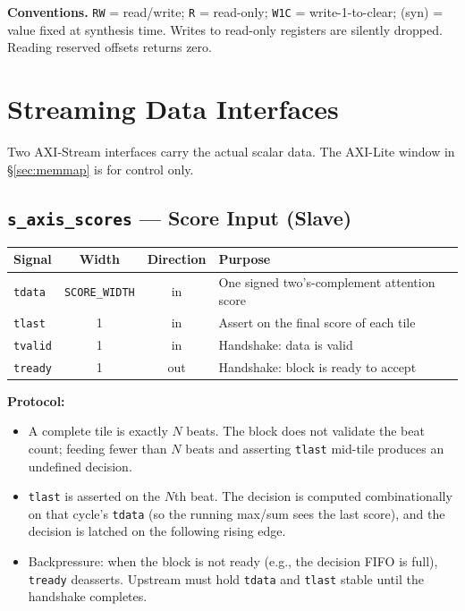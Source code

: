 \documentclass[11pt]{article}
\begin{document}
\medskip
\noindent\textbf{Conventions.} \texttt{RW} = read/write; \texttt{R} = read-only;
\texttt{W1C} = write-1-to-clear; (syn) = value fixed at synthesis time.
Writes to read-only registers are silently dropped. Reading reserved offsets
returns zero.

\clearpage

\section{Streaming Data Interfaces}
\label{sec:stream}

Two AXI-Stream interfaces carry the actual scalar data. The AXI-Lite window in
\S\ref{sec:memmap} is for control only.

\subsection{\texttt{s\_axis\_scores} --- Score Input (Slave)}
\label{sec:s_axis_scores}

\begin{table}[h]
\centering
\small
\begin{tabular}{@{}l c c p{8cm}@{}}
\toprule
Signal      & Width                  & Direction & Purpose \\
\midrule
\texttt{tdata}  & \texttt{SCORE\_WIDTH} & in        & One signed two's-complement attention score \\
\texttt{tlast}  & 1                     & in        & Assert on the final score of each tile \\
\texttt{tvalid} & 1                     & in        & Handshake: data is valid \\
\texttt{tready} & 1                     & out       & Handshake: block is ready to accept \\
\bottomrule
\end{tabular}
\end{table}

\noindent\textbf{Protocol:}
\begin{itemize}
\item A complete tile is exactly $N$ beats. The block does not validate the
  beat count; feeding fewer than $N$ beats and asserting \texttt{tlast}
  mid-tile produces an undefined decision.
\item \texttt{tlast} is asserted on the $N$th beat. The decision is computed
  combinationally on that cycle's \texttt{tdata} (so the running max/sum
  sees the last score), and the decision is latched on the following rising
  edge.
\item Backpressure: when the block is not ready (e.g., the decision FIFO is
  full), \texttt{tready} deasserts. Upstream must hold \texttt{tdata} and
  \texttt{tlast} stable until the handshake completes.
\end{itemize}
\end{document}
